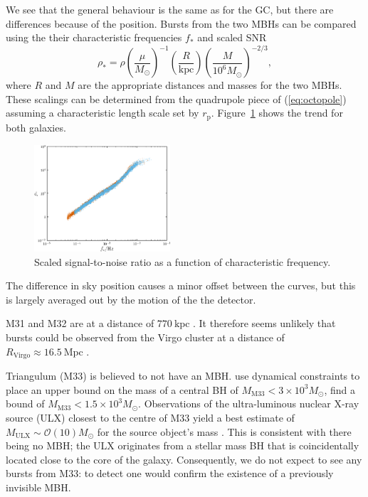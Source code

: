 \documentclass[useAMS,usedcolumn,usegraphicx,usenatbib]{mn2e}
\newcommand{\eqnref}[1]{(\ref{eq:#1})}
\newcommand{\Figref}[1]{Figure~\ref{fig:#1}}
\newcommand{\units}[1]{\ensuremath{~\mathrm{#1}}}
\newcommand{\sub}[1]{\ensuremath{_\mathrm{#1}}}
\newcommand{\order}[1]{\ensuremath{\mathcal{O}({#1})}}
\begin{document}
We see that the general behaviour is the same as for the GC, but there are differences because of the position. Bursts from the two MBHs can be compared using the their characteristic frequencies $f_\ast$ and scaled SNR
\begin{equation}
\rho_\ast = \rho \left(\frac{\mu}{M_\odot}\right)^{-1}\left(\frac{R}{\mathrm{kpc}}\right)\left(\frac{M}{10^6 M_\odot}\right)^{-2/3},
\end{equation}
where $R$ and $M$ are the appropriate distances and masses for the two MBHs. These scalings can be determined from the quadrupole piece of \eqnref{octopole} assuming a characteristic length scale set by $r\sub{p}$. \Figref{SNR-scaling} shows the trend for both galaxies.
\begin{figure}
  \begin{center}
  \includegraphics[width=0.45\textwidth]{Fig_SNR_scaled}
    \caption{Scaled signal-to-noise ratio as a function of characteristic frequency.}
    \label{fig:SNR-scaling}
  \end{center}
\end{figure}
The difference in sky position causes a minor offset between the curves, but this is largely averaged out by the motion of the the detector.

M31 and M32 are at a distance of $770\units{kpc}$ \citep{Karachentsev2004}. It therefore seems unlikely that bursts could be observed from the Virgo cluster at a distance of $R\sub{Virgo} \approx 16.5\units{Mpc}$ \citep{Mei2007}.

Triangulum (M33) is believed to not have an MBH. \citet{Merritt2001} use dynamical constraints to place an upper bound on the mass of a central BH of $M\sub{M33} < 3 \times 10^3 M_\odot$, \citet{Gebhardt2001} find a bound of $M\sub{M33} < 1.5 \times 10^3 M_\odot$. Observations of the ultra-luminous nuclear X-ray source (ULX) closest to the centre of M33 yield a best estimate of $M\sub{ULX} \sim \order{10} M_\odot$ for the source object's mass \citep{Foschini2004, Weng2009}. This is consistent with there being no MBH; the ULX originates from a stellar mass BH that is coincidentally located close to the core of the galaxy. Consequently, we do not expect to see any bursts from M33: to detect one would confirm the existence of a previously invisible MBH.
\end{document}
